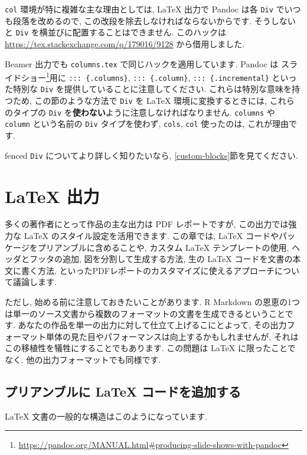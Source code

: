 \documentclass[
  11pt,
  lualatex,ja=standard,jafont=noto]{bxjsreport}
\renewcommand{\href}[2]{#2\footnote{\url{#1}}}
\begin{document}
\texttt{col} 環境が特に複雑な主な理由としては, LaTeX 出力で Pandoc は各 \texttt{Div} でいつも段落を改めるので, この改段を除去しなければならないからです. そうしないと \texttt{Div} を横並びに配置することはできません. このハックは \url{https://tex.stackexchange.com/q/179016/9128} から借用しました.

Beamer 出力でも \texttt{columns.tex} で同じハックを適用しています. Pandoc は \href{https://pandoc.org/MANUAL.html\#producing-slide-shows-with-pandoc}{スライドショー}用に \texttt{::: \{.columns\}}, \texttt{::: \{.column\}}, \texttt{::: \{.incremental\}} といった特別な \texttt{Div} を提供していることに注意してください. これらは特別な意味を持つため, この節のような方法で \texttt{Div} を LaTeX 環境に変換するときには, これらのタイプの \texttt{Div} を\textbf{使わない}ように注意しなければなりません. \texttt{columns} や \texttt{column} という名前の \texttt{Div} タイプを使わず, \texttt{cols}, \texttt{col} 使ったのは, これが理由です.

fenced \texttt{Div} についてより詳しく知りたいなら, \ref{custom-blocks}節を見てください.

\hypertarget{latex-output}{%
\chapter{LaTeX 出力}\label{latex-output}}

多くの著作者にとって作品の主な出力は PDF レポートですが, この出力では強力な LaTeX のスタイル設定を活用できます. この章では, LaTeX コードやパッケージをプリアンブルに含めることや, カスタム LaTeX テンプレートの使用, ヘッダとフッタの追加, 図を分割して生成する方法, 生の LaTeX コードを文書の本文に書く方法, といったPDFレポートのカスタマイズに使えるアプローチについて議論します.

ただし, 始める前に注意しておきたいことがあります. R Markdown の恩恵の1つは単一のソース文書から複数のフォーマットの文書を生成できるということです. あなたの作品を単一の出力に対して仕立て上げるこにとよって, その出力フォーマット単体の見た目やパフォーマンスは向上するかもしれませんが, それはこの移植性を犠牲にすることでもあります. この問題は LaTeX に限ったことでなく. 他の出力フォーマットでも同様です.

\hypertarget{latex-preamble}{%
\section{プリアンブルに LaTeX コードを追加する}\label{latex-preamble}}

LaTeX 文書の一般的な構造はこのようになっています.
\end{document}
